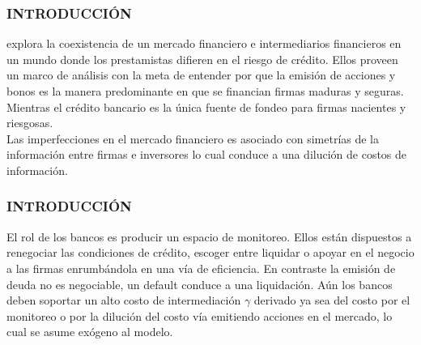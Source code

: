 \begin{frame}
	\frametitle{{\normalsize INTRODUCCIÓN} {}}
	\setcounter{equation}{0}
\cite{Freixas2000} explora la coexistencia de un mercado financiero e intermediarios financieros en un mundo donde los prestamistas difieren en el riesgo de crédito. Ellos proveen un marco de análisis con la meta de entender por que la emisión de acciones y bonos es la manera predominante en que se financian firmas maduras y seguras. Mientras el crédito bancario es la única fuente de fondeo para firmas nacientes y riesgosas.\\
Las imperfecciones en el mercado financiero es asociado con simetrías de la información entre firmas e inversores lo cual conduce a una dilución de costos de información. \\


 

\end{frame}

\begin{frame}
\frametitle{{\normalsize INTRODUCCIÓN} {}}
\setcounter{equation}{0}

El rol de los bancos es producir un espacio de monitoreo. Ellos están dispuestos a renegociar las condiciones de crédito, escoger entre liquidar o apoyar en el negocio a las firmas enrumbándola  en una vía de eficiencia. En contraste la emisión de deuda no es negociable, un default conduce a una liquidación.   
Aún los bancos deben soportar un alto costo de intermediación $\gamma$ derivado ya sea del costo por el monitoreo o por la dilución del costo vía emitiendo acciones en el mercado, lo cual se asume exógeno al modelo.




\end{frame}


